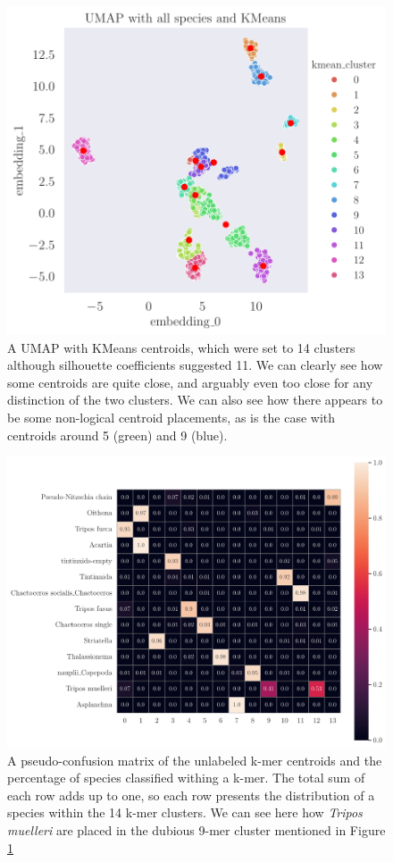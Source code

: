 \begin{figure}[H]
    \centering
    \includegraphics[width=1\linewidth]{latex/figures/kmeans_cluster_umap_on_all_species.pdf}
    \caption{A UMAP with KMeans centroids, which were set to 14 clusters although silhouette coefficients suggested 11. We can clearly see how some centroids are quite close, and arguably even too close for any distinction of the two clusters. We can also see how there appears to be some non-logical centroid placements, as is the case with centroids around 5 (green) and 9 (blue).}
    \label{fig:14-mer-umap}
\end{figure}
%
%
%
\begin{figure}[H]
    \centering
    \includegraphics[width=1\linewidth]{latex/figures/dinov2_confmat.pdf}
    \caption{A pseudo-confusion matrix of the unlabeled k-mer centroids and the percentage of species classified withing a k-mer. The total sum of each row adds up to one, so each row presents the distribution of a species within the 14 k-mer clusters. We can see here how \textit{Tripos muelleri} are placed in the dubious 9-mer cluster mentioned in Figure \ref{fig:14-mer-umap}}
    \label{fig:dinov2-confusion}
\end{figure}
%
%
%

